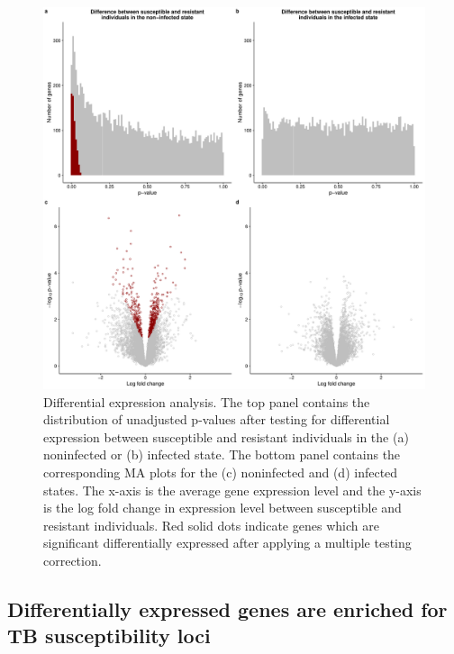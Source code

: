 \documentclass[fleqn,10pt]{wlscirep}
\begin{document}
\begin{figure}[p]
\centering
\includegraphics[width=\linewidth]{../figure/limma.pdf}
\caption{
Differential expression analysis. The top panel contains the distribution of unadjusted p-values after testing for differential expression between susceptible and resistant individuals in the (a) noninfected or (b) infected state. The bottom panel contains the corresponding MA plots for the (c) noninfected and (d) infected states. The x-axis is the average gene expression level and the y-axis is the log fold change in expression level between susceptible and resistant individuals. Red solid dots indicate genes which are significant differentially expressed after applying a multiple testing correction.
}
\label{fig:limma}
\end{figure}
\subsection*{Differentially expressed genes are enriched for TB susceptibility loci}
\end{document}
